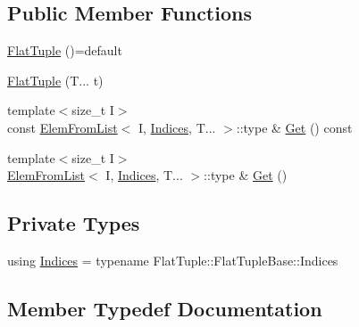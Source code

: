 \subsection*{Public Member Functions}
\begin{DoxyCompactItemize}
\item 
\hyperlink{classtesting_1_1internal_1_1FlatTuple_a056c58b5dd85f470ec5db1db9956c702}{Flat\+Tuple} ()=default
\item 
\hyperlink{classtesting_1_1internal_1_1FlatTuple_a611d01b9ff2437e4b9cfe3bbedc6d6ae}{Flat\+Tuple} (T... t)
\item 
{\footnotesize template$<$size\+\_\+t I$>$ }\\const \hyperlink{structtesting_1_1internal_1_1ElemFromList}{Elem\+From\+List}$<$ I, \hyperlink{classtesting_1_1internal_1_1FlatTuple_a004b42fc11ac1a85a9b1560fa83cdf77}{Indices}, T... $>$\+::type \& \hyperlink{classtesting_1_1internal_1_1FlatTuple_a9ea6508fa6413ceca5e38b8077c67938}{Get} () const
\item 
{\footnotesize template$<$size\+\_\+t I$>$ }\\\hyperlink{structtesting_1_1internal_1_1ElemFromList}{Elem\+From\+List}$<$ I, \hyperlink{classtesting_1_1internal_1_1FlatTuple_a004b42fc11ac1a85a9b1560fa83cdf77}{Indices}, T... $>$\+::type \& \hyperlink{classtesting_1_1internal_1_1FlatTuple_a48a13560f8963f727d81a7922e3b3e50}{Get} ()
\end{DoxyCompactItemize}
\subsection*{Private Types}
\begin{DoxyCompactItemize}
\item 
using \hyperlink{classtesting_1_1internal_1_1FlatTuple_a004b42fc11ac1a85a9b1560fa83cdf77}{Indices} = typename Flat\+Tuple\+::\+Flat\+Tuple\+Base\+::\+Indices
\end{DoxyCompactItemize}


\subsection{Member Typedef Documentation}
\mbox{\label{classtesting_1_1internal_1_1FlatTuple_a004b42fc11ac1a85a9b1560fa83cdf77}} 
